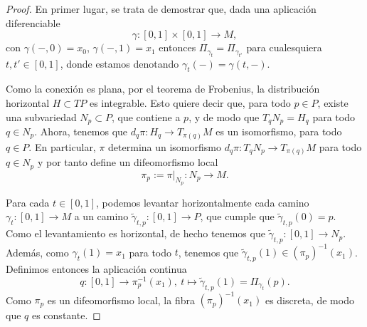 \documentclass[11pt,a4paper]{amsbook}
\theoremstyle{remark} \newtheorem{rmk}[subsection]{Observación}
\theoremstyle{definition} \newtheorem{defn}[subsection]{Definición}
\theoremstyle{definition} \newtheorem{ex}[subsection]{Ejemplo}
\theoremstyle{definition} \newtheorem{ej}[subsection]{Ejercicio}
\begin{document}
\begin{proof}
En primer lugar, se trata de demostrar que, dada una aplicación diferenciable \[\gamma:[0,1]\times [0,1]\rightarrow M,\] con $\gamma(-,0)=x_0$, $\gamma(-,1)=x_1$ entonces $\Pi_{\gamma_t}=\Pi_{\gamma_{t'}}$ para cualesquiera $t,t'\in [0,1]$, donde estamos denotando $\gamma_t(-)=\gamma(t,-)$.

Como la conexión es plana, por el teorema de Frobenius, la distribución horizontal $H\subset TP$ es integrable. Esto quiere decir que, para todo $p\in P$, existe una subvariedad $N_p \subset P$, que contiene a $p$, y de modo que $T_q N_p = H_q$ para todo $q\in N_p$. Ahora, tenemos que $d_q\pi: H_q \rightarrow T_{\pi(q)}M$ es un isomorfismo, para todo $q\in P$. En particular, $\pi$ determina un isomorfismo $d_q\pi: T_qN_p \rightarrow T_{\pi(q)}M$ para todo $q\in N_p$ y por tanto define un difeomorfismo local
\begin{equation*}
\pi_p:=\pi|_{N_p}: N_p \longrightarrow M.
\end{equation*}

Para cada $t\in [0,1]$, podemos levantar horizontalmente cada camino $\gamma_t:[0,1]\rightarrow M$ a un camino $\tilde{\gamma}_{t,p}:[0,1]\rightarrow P$, que cumple que $\tilde{\gamma}_{t,p}(0)=p$. Como el levantamiento es horizontal, de hecho tenemos que $\tilde{\gamma}_{t,p}:[0,1]\rightarrow N_p$. Además, como $\gamma_t(1)=x_1$ para todo $t$, tenemos que $\tilde{\gamma}_{t,p}(1)\in (\pi_p)^{-1}(x_1)$. Definimos entonces la aplicación continua
\begin{equation*}
q: [0,1] \rightarrow \pi_p^{-1}(x_1),\ t \mapsto \tilde{\gamma}_{t,p}(1) = \Pi_{\gamma_t}(p).
\end{equation*}
Como $\pi_p$ es un difeomorfismo local, la fibra $(\pi_p)^{-1}(x_1)$ es discreta, de modo que $q$ es constante.


\end{proof}
\end{document}
